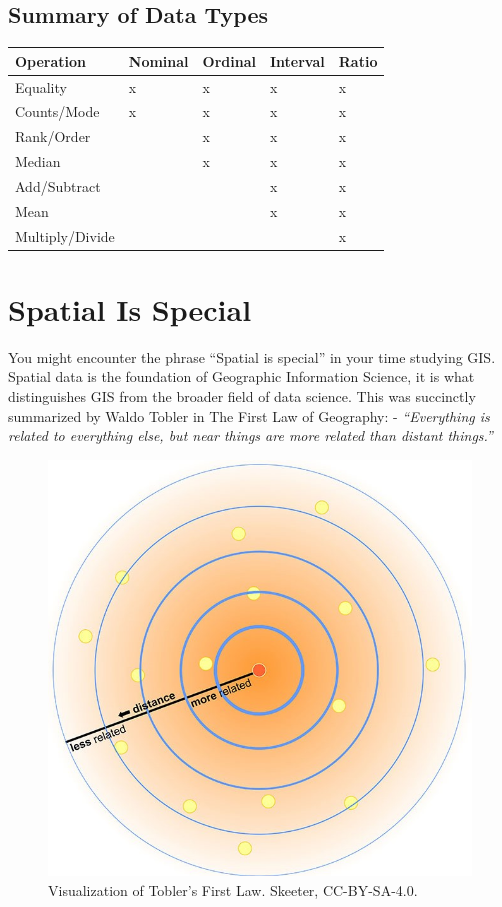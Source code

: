 \documentclass[
]{book}
\begin{document}
\hypertarget{summary-of-data-types}{%
\subsection{Summary of Data Types}\label{summary-of-data-types}}

\begin{longtable}[]{@{}lllll@{}}
\toprule\noalign{}
Operation & Nominal & Ordinal & Interval & Ratio \\
\midrule\noalign{}
\endhead
\bottomrule\noalign{}
\endlastfoot
Equality & x & x & x & x \\
Counts/Mode & x & x & x & x \\
Rank/Order & & x & x & x \\
Median & & x & x & x \\
Add/Subtract & & & x & x \\
Mean & & & x & x \\
Multiply/Divide & & & & x \\
\end{longtable}

\hypertarget{spatial-is-special}{%
\section{Spatial Is Special}\label{spatial-is-special}}

You might encounter the phrase ``Spatial is special'' in your time studying GIS. Spatial data is the foundation of Geographic Information Science, it is what distinguishes GIS from the broader field of data science. This was succinctly summarized by Waldo Tobler in The First Law of Geography:
- \emph{``Everything is related to everything else, but near things are more related than distant things.''}

\begin{figure}
\includegraphics[width=0.75\linewidth]{images/03-spatial-is-special} \caption{Visualization of Tobler's First Law. Skeeter, CC-BY-SA-4.0.}\label{fig:3-spatial-is-special}
\end{figure}
\end{document}
